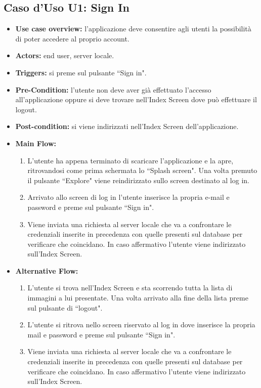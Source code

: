 \subsection*{Caso d'Uso U1: Sign In}
\begin{itemize}
    \item  \textbf{Use case overview:} l'applicazione deve consentire agli utenti la possibilit\`a di poter accedere al proprio account.
    \item \textbf{Actors:} end user, server locale.
    \item \textbf{Triggers:} si preme sul pulsante ``Sign in".
    \item \textbf{Pre-Condition:} l'utente non deve aver gi\`a effettuato l'accesso all'applicazione oppure si deve trovare nell'Index Screen dove pu\`o effettuare il logout.
    \item \textbf{Post-condition:} si viene indirizzati nell'Index Screen dell'applicazione.
    \item \textbf{Main Flow:} \begin{enumerate}
              \item L'utente ha appena terminato di scaricare l'applicazione e la apre, ritrovandosi come prima schermata lo ``Splash screen". Una volta premuto il pulsante ``Explore" viene reindirizzato sullo screen destinato al log in.
              \item Arrivato allo screen di log in l'utente inserisce la propria e-mail e password e preme sul pulsante ``Sign in".
              \item Viene inviata una richiesta al server locale che va a confrontare le credenziali inserite in precedenza con quelle presenti sul database per verificare che coincidano. In caso affermativo l'utente viene indirizzato sull'Index Screen.

          \end{enumerate}
    \item \textbf{Alternative Flow:}\begin{enumerate}
              \item L'utente si trova nell'Index Screen e sta scorrendo tutta la lista di immagini a lui presentate. Una volta arrivato alla fine della lista preme sul pulsante di ``logout".
              \item L'utente si ritrova nello screen riservato al log in dove inserisce la propria mail e password e preme sul pulsante ``Sign in".
              \item Viene inviata una richiesta al server locale che va a confrontare le credenziali inserite in precedenza con quelle presenti sul database per verificare che coincidano. In caso affermativo l'utente viene indirizzato sull'Index Screen.
          \end{enumerate}


\end{itemize}
